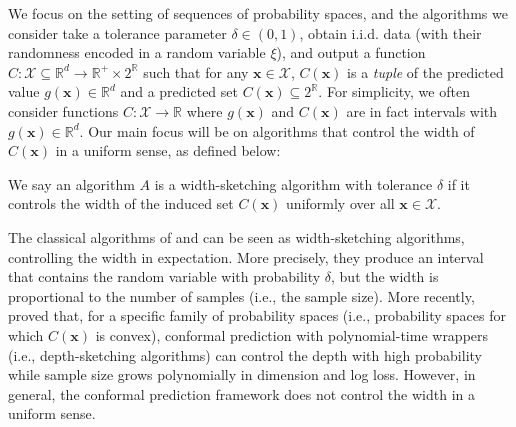 We focus on the setting of sequences of probability spaces, and the algorithms we consider take a tolerance parameter $\delta \in (0,1)$, obtain i.i.d. data (with their randomness encoded in a random variable $\xi$), and output a function $C: \mathcal{X} \subseteq \mathbb{R}^d \rightarrow \mathbb{R}^+ \times 2^{\mathbb{R}}$ such that for any $\bm{x} \in \mathcal{X}$, $C(\bm{x})$ is a \emph{tuple} of the predicted value $g(\bm{x}) \in \mathbb{R}^d$ and a predicted set $C(\bm{x}) \subseteq 2^{\mathbb{R}}$. For simplicity, we often consider functions $C: \mathcal{X} \rightarrow \mathbb{R}$ where $g(\bm{x})$ and $C(\bm{x})$ are in fact intervals with $g(\bm{x}) \in \mathbb{R}^d$. Our main focus will be on algorithms that control the width of $C(\bm{x})$ in a uniform sense, as defined below:

\begin{definition}
    We say an algorithm $A$ is a width-sketching algorithm with tolerance $\delta$ if it controls the width of the induced set $C(\bm{x})$ uniformly over all $\bm x \in \mathcal{X}$.
\end{definition}

The classical algorithms of \cite{guttman1970statistical} and \cite{tukey1947nonparametric,tukey1948nonparametric} can be seen as width-sketching algorithms, controlling the width in expectation. More precisely, they produce an interval that contains the random variable with probability $\delta$, but the width is proportional to the number of samples (i.e., the sample size). More recently, \cite{barber2021limits} proved that, for a specific family of probability spaces (i.e., probability spaces for which $C(\bm{x})$ is convex), conformal prediction with polynomial-time wrappers (i.e., depth-sketching algorithms) can control the depth with high probability while sample size grows polynomially in dimension and log loss. However, in general, the conformal prediction framework does not control the width in a uniform sense.

